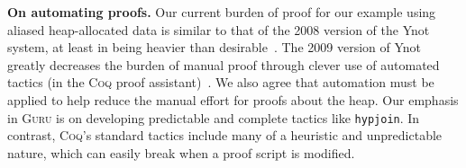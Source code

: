 \documentclass[9pt,natbib]{sigplanconf}
\begin{document}


\textbf{On automating proofs.} Our current burden of proof for our
example using aliased heap-allocated data is similar to that of the
2008 version of the Ynot system, at least in being heavier than
desirable~\cite{nanevski+08}.  The 2009 version of Ynot greatly
decreases the burden of manual proof through clever use of automated
tactics (in the \textsc{Coq} proof assistant)~\cite{ynot09}.  We also
agree that automation must be applied to help reduce the manual effort
for proofs about the heap.  Our emphasis in \textsc{Guru} is on
developing predictable and complete tactics like \texttt{hypjoin}.  In
contrast, \textsc{Coq}'s standard tactics include many of a heuristic
and unpredictable nature, which can easily break when a proof script
is modified.

\end{document}
